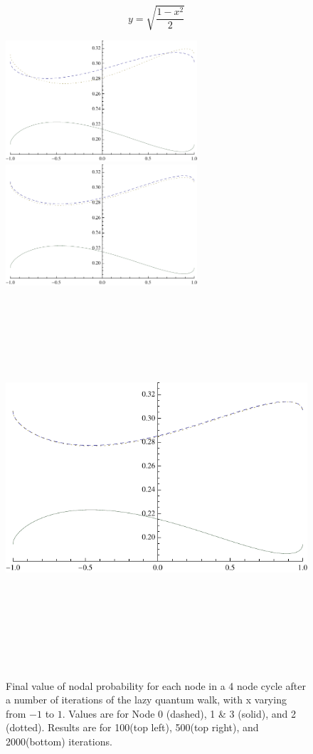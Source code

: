 \documentclass[a0,portrait]{a0poster}
\begin{document}
\begin{center}
{\begin{equation}
y=\sqrt{\frac{1-x^2}{2}}
\end{equation}

\begin{figure}
\includegraphics[height=45mm]{xyy-100-steps-1-1.pdf}
\includegraphics[height=45mm]{xyy-500-steps-1-1.pdf}
\includegraphics[height=140mm]{xyy-2000-steps-1-1.pdf}
  \caption{Final value of nodal probability for each node in a 4 node cycle after a number of iterations of the lazy quantum walk, with x varying from $-1$ to $1$. Values are for Node 0 (dashed), 1 \& 3 (solid), and 2 (dotted). Results are for 100(top left), 500(top right), and 2000(bottom) iterations.}
\label{trends}
\end{figure}

}
\end{center}
\end{document}
